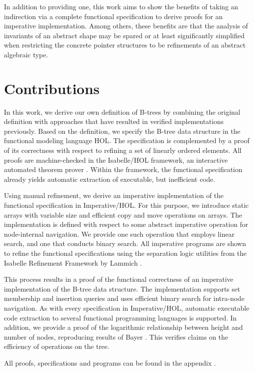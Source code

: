 In addition to providing one, this work aims to show the benefits
of taking an indirection via a complete functional specification
to derive proofs for an imperative implementation.
Among others, these benefits are that the analysis of invariants of an abstract shape may be spared
or at least significantly simplified when
restricting the concrete pointer structures to be refinements
of an abstract algebraic type.

\section{Contributions}

In this work, we derive our own definition of B-trees
by combining the original definition
with approaches that have resulted in verified implementations previously.
Based on the definition, we specify the B-tree data structure in the
functional modeling language HOL.
The specification is complemented by a proof of its correctness
with respect to refining a set of linearly ordered elements.
All proofs are machine-checked in the Isabelle/HOL framework,
an interactive automated theorem prover \parencite{DBLP:books/sp/NipkowK14}.
Within the framework,
the functional specification already yields automatic extraction of executable,
but inefficient code.

Using manual refinement, we derive an imperative implementation of the functional specification
in Imperative/HOL.
For this purpose, we introduce static arrays with variable size
and efficient copy and move operations on arrays.
The implementation is defined with respect to some abstract imperative
operation for node-internal navigation.
We provide one such operation that employs linear search,
and one that conducts binary search.
All imperative programs are shown to refine the functional specifications
using the separation logic utilities from the Isabelle Refinement Framework by
Lammich \parencite{DBLP:journals/jar/Lammich19}.

This process results in a proof of the functional correctness
of an imperative implementation of the B-tree data structure.
The implementation supports set membership and insertion queries
and uses efficient binary search for intra-node navigation.
As with every specification in Imperative/HOL,
automatic executable code extraction to
several functional programming languages is supported.
In addition, we provide a proof of the logarithmic relationship between height and number of nodes,
reproducing results of Bayer \parencite{DBLP:journals/acta/BayerM72}.
This verifies claims on the efficiency of
operations on the tree.

All proofs, specifications and programs can be found in the appendix \parencite{MuendlerAppendix21}.